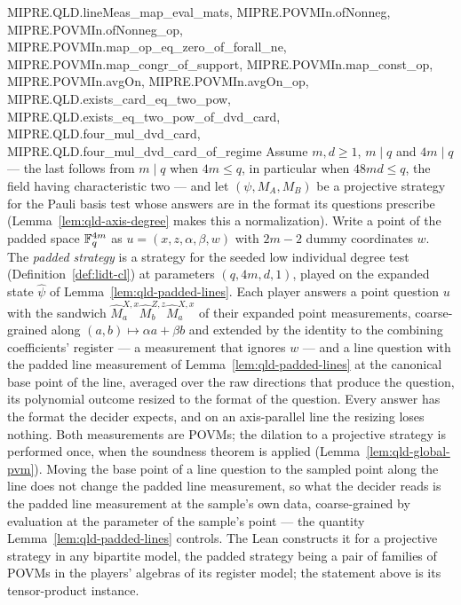 \begin{lemma}
{  MIPRE.QLD.lineMeas_map_eval_mats, MIPRE.POVMIn.ofNonneg, MIPRE.POVMIn.ofNonneg_op,
  MIPRE.POVMIn.map_op_eq_zero_of_forall_ne, MIPRE.POVMIn.map_congr_of_support,
  MIPRE.POVMIn.map_const_op, MIPRE.POVMIn.avgOn, MIPRE.POVMIn.avgOn_op,
  MIPRE.QLD.exists_card_eq_two_pow, MIPRE.QLD.exists_eq_two_pow_of_dvd_card,
  MIPRE.QLD.four_mul_dvd_card, MIPRE.QLD.four_mul_dvd_card_of_regime}
\leanok
Assume $m, d \geq 1$, $m \mid q$ and $4m \mid q$ --- the last follows from $m \mid q$ when
$4m \leq q$, in particular when $48md \leq q$, the field having characteristic two --- and let
$(\psi, M_A, M_B)$ be a projective strategy for the Pauli basis test whose answers are in the format
its questions prescribe (Lemma~\ref{lem:qld-axis-degree} makes this a normalization). Write a point
of the padded space $\mathbb{F}_q^{4m}$ as $u = (x, z, \alpha, \beta, w)$ with $2m - 2$ dummy coordinates
$w$. The \emph{padded strategy} is a strategy for the seeded low individual degree test
(Definition~\ref{def:lidt-cl}) at parameters $(q, 4m, d, 1)$, played on the expanded state
$\hat{\psi}$ of Lemma~\ref{lem:qld-padded-lines}. Each player answers a point question $u$ with the
sandwich $\widehat{M}^{X, x}_a \widehat{M}^{Z, z}_b \widehat{M}^{X, x}_a$ of their expanded point
measurements, coarse-grained along $(a, b) \mapsto \alpha a + \beta b$ and extended by the identity
to the combining coefficients' register --- a measurement that ignores $w$ --- and a line question
with the padded line measurement of Lemma~\ref{lem:qld-padded-lines} at the canonical base point of
the line, averaged over the raw directions that produce the question, its polynomial outcome resized
to the format of the question. Every answer has the format the decider expects, and on an
axis-parallel line the resizing loses nothing. Both measurements are POVMs; the dilation to a
projective strategy is performed once, when the soundness theorem is applied
(Lemma~\ref{lem:qld-global-pvm}). Moving the base point of a line question to the sampled point
along the line does not change the padded line measurement, so what the decider reads is the padded
line measurement at the sample's own data, coarse-grained by evaluation at the parameter of the
sample's point --- the quantity Lemma~\ref{lem:qld-padded-lines} controls. The Lean constructs it
for a projective strategy in any bipartite model, the padded strategy being a pair of families of
POVMs in the players' algebras of its register model; the statement above is its tensor-product
instance.
\end{lemma}
